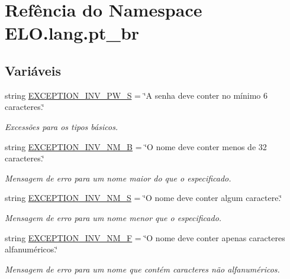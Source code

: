 \hypertarget{namespaceELO_1_1lang_1_1pt__br}{\section{Refência do Namespace E\-L\-O.\-lang.\-pt\-\_\-br}
\label{d5/d70/namespaceELO_1_1lang_1_1pt__br}
}
\subsection*{Variáveis}
\begin{DoxyCompactItemize}
\item 
string \hyperlink{namespaceELO_1_1lang_1_1pt__br_a29c3f098306450c2e590fdf8cec9fbbc}{E\-X\-C\-E\-P\-T\-I\-O\-N\-\_\-\-I\-N\-V\-\_\-\-P\-W\-\_\-\-S} = \char`\"{}A senha deve conter no mínimo 6 caracteres.\char`\"{}
\begin{DoxyCompactList}\small\item\em Excessões para os tipos básicos. \end{DoxyCompactList}\item 
string \hyperlink{namespaceELO_1_1lang_1_1pt__br_ae835fd7dd58a6cda2019cccefa9e83f0}{E\-X\-C\-E\-P\-T\-I\-O\-N\-\_\-\-I\-N\-V\-\_\-\-N\-M\-\_\-\-B} = \char`\"{}O nome deve conter menos de 32 caracteres.\char`\"{}
\begin{DoxyCompactList}\small\item\em Mensagem de erro para um nome maior do que o especificado. \end{DoxyCompactList}\item 
string \hyperlink{namespaceELO_1_1lang_1_1pt__br_aeec5602b588bc7ff8c48415da9631c67}{E\-X\-C\-E\-P\-T\-I\-O\-N\-\_\-\-I\-N\-V\-\_\-\-N\-M\-\_\-\-S} = \char`\"{}O nome deve conter algum caractere.\char`\"{}
\begin{DoxyCompactList}\small\item\em Mensagem de erro para um nome menor que o especificado. \end{DoxyCompactList}\item 
string \hyperlink{namespaceELO_1_1lang_1_1pt__br_a72ba2c52ef08e79f9edbea870bed1a83}{E\-X\-C\-E\-P\-T\-I\-O\-N\-\_\-\-I\-N\-V\-\_\-\-N\-M\-\_\-\-F} = \char`\"{}O nome deve conter apenas caracteres alfanuméricos.\char`\"{}
\begin{DoxyCompactList}\small\item\em Mensagem de erro para um nome que contém caracteres não alfanuméricos. \end{DoxyCompactList}\item 

\end{DoxyCompactItemize}
